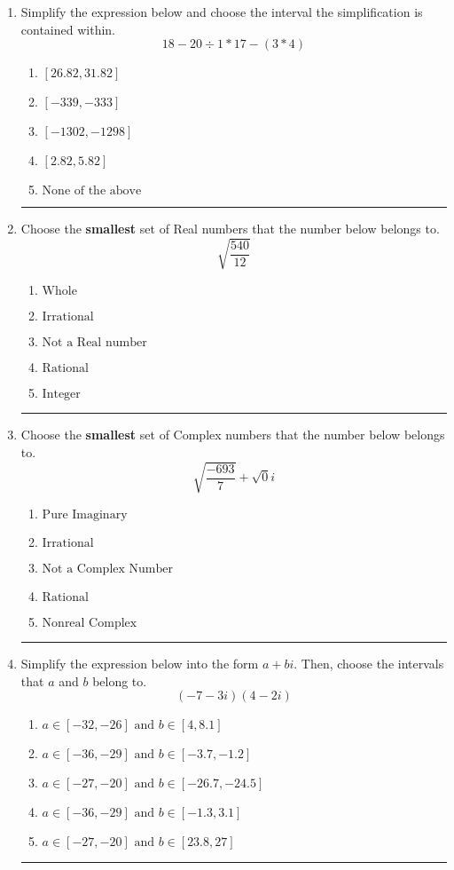 \documentclass[14pt]{extbook}
\newcommand{\litem}[1]{\item#1\hspace*{-1cm}\rule{\textwidth}{0.4pt}}
\begin{document}
\begin{enumerate}
{\begin{enumerate}[label=\Alph*.]
\end{enumerate} }
\litem{
Simplify the expression below and choose the interval the simplification is contained within.\[ 18 - 20 \div 1 * 17 - (3 * 4) \]\begin{enumerate}[label=\Alph*.]
\item \( [26.82, 31.82] \)
\item \( [-339, -333] \)
\item \( [-1302, -1298] \)
\item \( [2.82, 5.82] \)
\item \( \text{None of the above} \)

\end{enumerate} }
\litem{
Choose the \textbf{smallest} set of Real numbers that the number below belongs to.\[ \sqrt{\frac{540}{12}} \]\begin{enumerate}[label=\Alph*.]
\item \( \text{Whole} \)
\item \( \text{Irrational} \)
\item \( \text{Not a Real number} \)
\item \( \text{Rational} \)
\item \( \text{Integer} \)

\end{enumerate} }
\litem{
Choose the \textbf{smallest} set of Complex numbers that the number below belongs to.\[ \sqrt{\frac{-693}{7}}+\sqrt{0}i \]\begin{enumerate}[label=\Alph*.]
\item \( \text{Pure Imaginary} \)
\item \( \text{Irrational} \)
\item \( \text{Not a Complex Number} \)
\item \( \text{Rational} \)
\item \( \text{Nonreal Complex} \)

\end{enumerate} }
\litem{
Simplify the expression below into the form $a+bi$. Then, choose the intervals that $a$ and $b$ belong to.\[ (-7 - 3 i)(4 - 2 i) \]\begin{enumerate}[label=\Alph*.]
\item \( a \in [-32, -26] \text{ and } b \in [4, 8.1] \)
\item \( a \in [-36, -29] \text{ and } b \in [-3.7, -1.2] \)
\item \( a \in [-27, -20] \text{ and } b \in [-26.7, -24.5] \)
\item \( a \in [-36, -29] \text{ and } b \in [-1.3, 3.1] \)
\item \( a \in [-27, -20] \text{ and } b \in [23.8, 27] \)


\end{enumerate}}
\end{enumerate}
\end{document}
